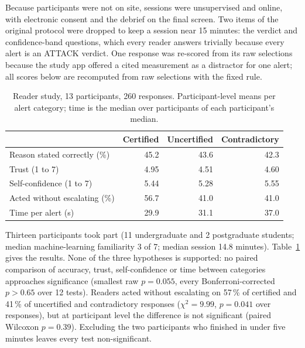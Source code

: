 Because participants were not on site, sessions were unsupervised and online, with electronic consent and the debrief on the final screen. Two items of the original protocol were dropped to keep a session near 15 minutes: the verdict and confidence-band questions, which every reader answers trivially because every alert is an ATTACK verdict. One response was re-scored from its raw selections because the study app offered a cited measurement as a distractor for one alert; all scores below are recomputed from raw selections with the fixed rule.

\begin{table}[t]
\caption{Reader study, 13 participants, 260 responses. Participant-level means per alert category; time is the median over participants of each participant's median.}
\label{tab:reader}
\centering\footnotesize
\begin{tabular}{@{}lrrr@{}}
\toprule
& \textbf{Certified} & \textbf{Uncertified} & \textbf{Contradictory} \\
\midrule
Reason stated correctly (\%) & 45.2 & 43.6 & 42.3 \\
Trust (1 to 7) & 4.95 & 4.51 & 4.60 \\
Self-confidence (1 to 7) & 5.44 & 5.28 & 5.55 \\
Acted without escalating (\%) & 56.7 & 41.0 & 41.0 \\
Time per alert (s) & 29.9 & 31.1 & 37.0 \\
\bottomrule
\end{tabular}
\end{table}

Thirteen participants took part (11 undergraduate and 2 postgraduate students; median machine-learning familiarity 3 of 7; median session 14.8 minutes). Table~\ref{tab:reader} gives the results. None of the three hypotheses is supported: no paired comparison of accuracy, trust, self-confidence or time between categories approaches significance (smallest raw $p = 0.055$, every Bonferroni-corrected $p > 0.65$ over 12 tests). Readers acted without escalating on 57\,\% of certified and 41\,\% of uncertified and contradictory responses ($\chi^2 = 9.99$, $p = 0.041$ over responses), but at participant level the difference is not significant (paired Wilcoxon $p = 0.39$). Excluding the two participants who finished in under five minutes leaves every test non-significant.

